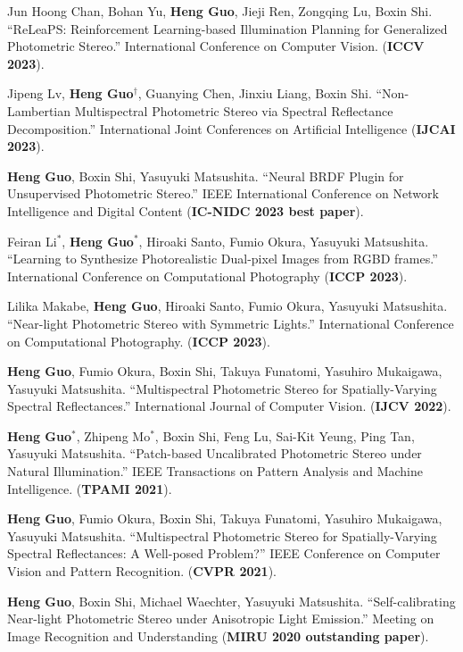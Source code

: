 \begin{enumerate}[label={[\arabic*]}]
	\item Jun Hoong Chan, Bohan Yu, \textbf{Heng Guo}, Jieji Ren, Zongqing Lu, Boxin Shi. ``ReLeaPS: Reinforcement Learning-based Illumination Planning for Generalized Photometric Stereo.'' International Conference on Computer Vision. (\textbf{ICCV 2023}).
	\item Jipeng Lv, \textbf{Heng Guo$^{\dagger}$}, Guanying Chen, Jinxiu Liang, Boxin Shi. ``Non-Lambertian Multispectral Photometric Stereo via Spectral Reflectance Decomposition.'' International Joint Conferences on Artificial Intelligence (\textbf{IJCAI 2023}).
	\item \textbf{Heng Guo}, Boxin Shi, Yasuyuki Matsushita. ``Neural BRDF Plugin for Unsupervised Photometric Stereo.'' IEEE International Conference on Network Intelligence and Digital Content (\textbf{IC-NIDC 2023 best paper}).
	\item Feiran Li$^*$, \textbf{Heng Guo}$^*$, Hiroaki Santo, Fumio Okura, Yasuyuki Matsushita. ``Learning to Synthesize Photorealistic Dual-pixel Images from RGBD frames.'' International Conference on Computational Photography (\textbf{ICCP 2023}).
	\item Lilika Makabe, \textbf{Heng Guo}, Hiroaki Santo, Fumio Okura, Yasuyuki Matsushita. ``Near-light Photometric Stereo with Symmetric Lights.'' International Conference on Computational Photography. (\textbf{ICCP 2023}).
	\item \textbf{Heng Guo}, Fumio Okura, Boxin Shi, Takuya Funatomi, Yasuhiro Mukaigawa, Yasuyuki Matsushita. ``Multispectral Photometric Stereo for Spatially-Varying Spectral Reflectances.'' International Journal of Computer Vision. (\textbf{IJCV 2022}). 
	\item \textbf{Heng Guo$^*$}, Zhipeng Mo$^*$, Boxin Shi, Feng Lu, Sai-Kit Yeung, Ping Tan, Yasuyuki Matsushita. ``Patch-based Uncalibrated Photometric Stereo under Natural Illumination.'' 
	IEEE Transactions on Pattern Analysis and Machine Intelligence. (\textbf{TPAMI 2021}). 
	\item \textbf{Heng Guo}, Fumio Okura, Boxin Shi, Takuya Funatomi, Yasuhiro Mukaigawa, Yasuyuki Matsushita. ``Multispectral Photometric Stereo for Spatially-Varying Spectral Reflectances: A Well-posed Problem?'' IEEE Conference on Computer Vision and Pattern Recognition. (\textbf{CVPR 2021}). 
	\item \textbf{Heng Guo}, Boxin Shi, Michael Waechter, Yasuyuki Matsushita. ``Self-calibrating Near-light Photometric Stereo under Anisotropic Light Emission.'' Meeting on Image Recognition and Understanding (\textbf{MIRU 2020 outstanding paper}).  

\end{enumerate}
